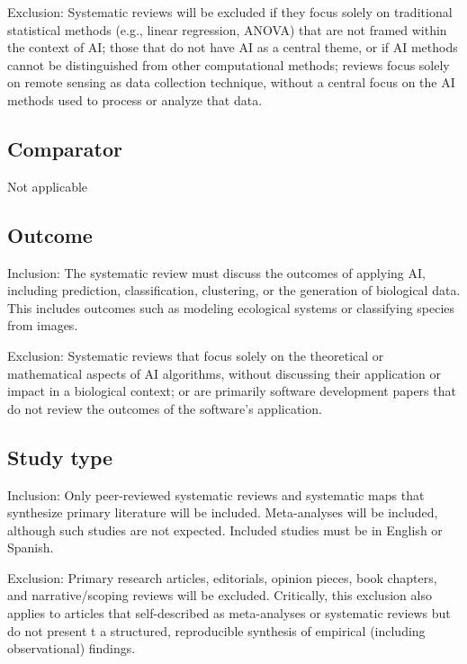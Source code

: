 \documentclass{article}
\begin{document}
Exclusion: Systematic reviews will be excluded if they focus solely on traditional statistical methods (e.g., linear regression, ANOVA) that are not framed within the context of AI; those that do not have AI as a central theme, or if AI methods cannot be distinguished from other computational methods; reviews focus solely on remote sensing as data collection technique, without a central focus on the AI methods used to process or analyze that data.

\subsection{Comparator}
Not applicable

\subsection{Outcome}
Inclusion: The systematic review must discuss the outcomes of applying AI, including prediction, classification, clustering, or the generation of biological data. This includes outcomes such as modeling ecological systems or classifying species from images.

Exclusion: Systematic reviews that focus solely on the theoretical or mathematical aspects of AI algorithms, without discussing their application or impact in a biological context; or are primarily software development papers that do not review the outcomes of the software's application.

\subsection{Study type}
Inclusion: Only peer-reviewed systematic reviews and systematic maps that synthesize primary literature will be included. Meta-analyses will be included, although such studies are not expected. Included studies must be in English or Spanish.

Exclusion: Primary research articles, editorials, opinion pieces, book chapters, and narrative/scoping reviews will be excluded. Critically, this exclusion also applies to articles that self-described as meta-analyses or systematic reviews but do not present t a structured, reproducible synthesis of empirical (including observational) findings.
\end{document}
